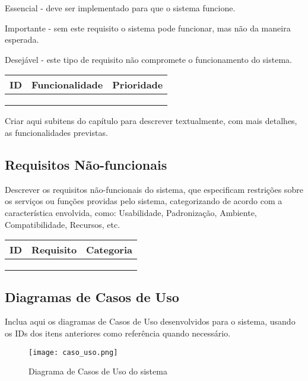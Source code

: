 \documentclass[a4paper,12pt]{article}
\begin{document}
Essencial - deve ser implementado para que o sistema funcione.

Importante - sem este requisito o sistema pode funcionar, mas não da maneira esperada.

Desejável - este tipo de requisito não compromete o funcionamento do sistema.

\begin{longtable}{|c|p{10cm}|c|}
    \hline
    \textbf{ID} & \textbf{Funcionalidade} & \textbf{Prioridade} \\
    \hline
     &  &  \\
    \hline
     &  &  \\
    \hline
     &  &  \\
    \hline
\end{longtable}

Criar aqui subitens do capítulo para descrever textualmente, com mais detalhes, as funcionalidades previstas.

\subsection{Requisitos Não-funcionais}
Descrever os requisitos não-funcionais do sistema, que especificam restrições sobre os serviços ou funções providas pelo sistema, categorizando de acordo com a característica envolvida, como: Usabilidade, Padronização, Ambiente, Compatibilidade, Recursos, etc.

\begin{longtable}{|c|p{10cm}|c|}
    \hline
    \textbf{ID} & \textbf{Requisito} & \textbf{Categoria} \\
    \hline
     &  &  \\
    \hline
     &  &  \\
    \hline
     &  &  \\
    \hline
\end{longtable}

\subsection{Diagramas de Casos de Uso}
Inclua aqui os diagramas de Casos de Uso desenvolvidos para o sistema, usando os IDs dos itens anteriores como referência quando necessário.

\begin{figure}[h]
    \centering
    \texttt{[image: caso\_uso.png]} %
    \caption{Diagrama de Casos de Uso do sistema}
    \label{fig:caso_uso}
\end{figure}
\end{document}
